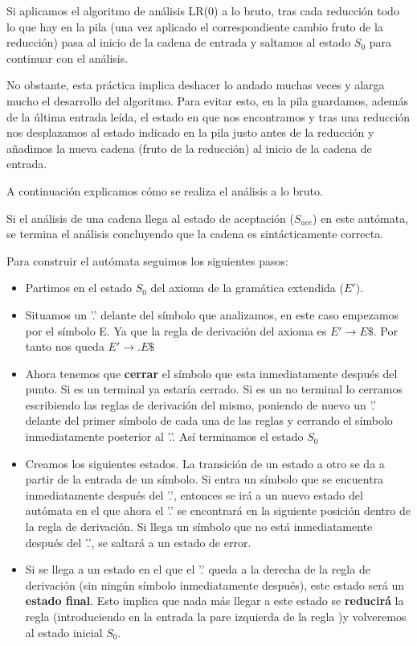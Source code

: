 \documentclass{apuntes}
\begin{document}
\begin{example}
Si aplicamos el algoritmo de análisis LR(0) a lo bruto, tras cada reducción todo lo que hay en la pila (una vez aplicado el correspondiente cambio fruto de la reducción) pasa al inicio de la cadena de entrada y saltamos al estado $S_0$ para continuar con el análisis.

No obstante, esta práctica implica deshacer lo andado muchas veces y alarga mucho el desarrollo del algoritmo. Para evitar esto, en la pila guardamos, además de la última entrada leída, el estado en que nos encontramos y tras una reducción nos desplazamos al estado indicado en la pila justo antes de la reducción y añadimos la nueva cadena (fruto de la reducción) al inicio de la cadena de entrada.

A continuación explicamos cómo se realiza el análisis a lo bruto.

Si el análisis de una cadena llega al estado de aceptación ($S_{acc}$) en este autómata, se termina el análisis concluyendo que la cadena es sintácticamente correcta.

Para construir el autómata seguimos los siguientes pasos:
\begin{itemize}
\item Partimos en el estado $S_0$ del axioma de la gramática extendida ($E'$).
\item Situamos un '.' delante del símbolo que analizamos, en este caso empezamos por el símbolo E. Ya que la regla de derivación del axioma es $E' \rightarrow E\$$. Por tanto nos queda $E' \rightarrow .E\$$
\item Ahora tenemos que \textbf{cerrar} el símbolo que esta inmediatamente después del punto. Si es un terminal ya estaría cerrado. Si es un no terminal lo cerramos escribiendo las reglas de derivación del mismo, poniendo de nuevo un '.' delante del primer símbolo de cada una de las reglas y cerrando el símbolo inmediatamente posterior al '.'. Así terminamos el estado $S_0$
\item Creamos los siguientes estados. La transición de un estado a otro se da a partir de la entrada de un símbolo. Si entra un símbolo que se encuentra inmediatamente después del '.', entonces se irá a un nuevo estado del autómata en el que ahora el '.' se encontrará en la siguiente posición dentro de la regla de derivación. Si llega un símbolo que no está inmediatamente después del '.', se saltará a un estado de error.
\item Si se llega a un estado en el que el '.' queda a la derecha de la regla de derivación (sin ningún símbolo inmediatamente después), este estado será un \textbf{estado final}. Esto implica que nada más llegar a este estado se \textbf{reducirá} la regla (introduciendo en la entrada la pare izquierda de la regla )y volveremos al estado inicial $S_0$.
\end{itemize}


\end{example}
\end{document}
